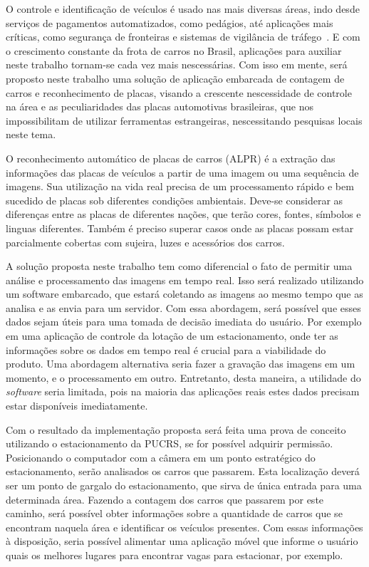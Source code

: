 
O controle e identificação de veículos é usado nas mais diversas áreas, indo
desde serviços de pagamentos automatizados, como pedágios, até aplicações mais
críticas, como segurança de fronteiras e sistemas de vigilância de
tráfego~\cite{ahmad2015automatic}. E com o crescimento constante da frota de
carros no Brasil, aplicações para auxiliar neste trabalho tornam-se cada vez
mais nescessárias. Com isso em mente, será proposto neste trabalho uma solução de
aplicação embarcada de contagem de carros e reconhecimento de placas, visando a
crescente nescessidade de controle na área e as peculiaridades das placas
automotivas brasileiras, que nos impossibilitam de utilizar ferramentas
estrangeiras, nescessitando pesquisas locais neste tema.

O reconhecimento automático de placas de carros (ALPR) é a extração das
informações das placas de veículos a partir de uma imagem ou uma sequência de
imagens. Sua utilização na vida real precisa de um processamento rápido e
bem sucedido de placas sob diferentes condições ambientais. Deve-se considerar as
diferenças entre as placas de diferentes nações, que terão cores, fontes, símbolos e
linguas diferentes. Também é preciso superar casos onde as placas possam estar 
parcialmente cobertas com sujeira, luzes e acessórios dos carros.~\cite{s2013automatic}

A solução proposta neste trabalho tem como diferencial o fato de permitir uma
análise e processamento das imagens em tempo real. Isso será realizado
utilizando um software embarcado, que estará coletando as imagens ao mesmo tempo
que as analisa e as envia para um servidor. Com essa abordagem, será possível 
que esses dados sejam úteis para uma tomada de decisão imediata do usuário. Por exemplo em uma
aplicação de controle da lotação de um estacionamento, onde ter as informações
sobre os dados em tempo real é crucial para a viabilidade do produto. Uma
abordagem alternativa seria fazer a gravação das imagens em um momento, e o 
processamento em outro. Entretanto, desta maneira, a utilidade do \emph{software} seria limitada,
pois na maioria das aplicações reais estes dados precisam estar disponíveis imediatamente.

Com o resultado da implementação proposta será feita uma prova de conceito utilizando o estacionamento da
PUCRS, se for possível adquirir permissão. Posicionando o computador com a câmera em um ponto estratégico 
do estacionamento, serão analisados os carros que passarem. Esta localização deverá ser um ponto de gargalo
do estacionamento, que sirva de única entrada para uma determinada área. Fazendo a contagem dos carros que
passarem por este caminho, será possível obter informações sobre a quantidade de carros que se encontram
naquela área e identificar os veículos presentes. Com essas informações à disposição, seria possível alimentar
uma aplicação móvel que informe o usuário quais os melhores lugares para encontrar vagas para estacionar, por 
exemplo.

